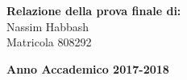 \documentclass[a4paper,12pt]{report}
\begin{document}
\begin{titlepage}
        \begin{flushright}
            {\large \textbf{Relazione della prova finale di:}} \\
            \large{Nassim Habbash} \\
            \large{Matricola 808292} 
        \end{flushright}
        
        \vspace{40mm}
        \begin{center}
            {\large{\bf Anno Accademico 2017-2018}}
        \end{center}

        \restoregeometry
        
    \end{titlepage}
    
\end{document}
